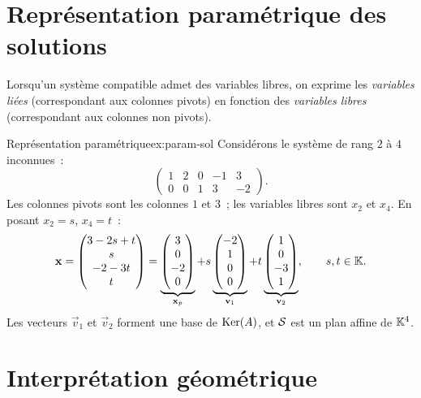 \section{Représentation paramétrique des solutions}\label{sec:parametrique}

Lorsqu'un système compatible admet des variables libres, on exprime les
\emph{variables liées} (correspondant aux colonnes
pivots) en fonction des \emph{variables libres}
(correspondant aux colonnes non pivots).

\begin{example}{Représentation paramétrique}{ex:param-sol}
  Considérons le système de rang $2$ à $4$ inconnues~:
  \[
    \left(\begin{array}{cccc|c}
      1 & 2 & 0 & -1 & 3\\
      0 & 0 & 1 & 3 & -2
    \end{array}\right).
  \]
  Les colonnes pivots sont les colonnes $1$ et $3$~; les variables libres
  sont $x_2$ et $x_4$. En posant $x_2=s$, $x_4=t$~:
  \[
    \mathbf{x}=\begin{pmatrix}3-2s+t\\s\\-2-3t\\t\end{pmatrix}
    =\underbrace{\begin{pmatrix}3\\0\\-2\\0\end{pmatrix}}_{\mathbf{x}_p}
    +s\underbrace{\begin{pmatrix}-2\\1\\0\\0\end{pmatrix}}_{\mathbf{v}_1}
    +t\underbrace{\begin{pmatrix}1\\0\\-3\\1\end{pmatrix}}_{\mathbf{v}_2},
    \qquad s,t\in{\mathbb{K}}.
  \]
  Les vecteurs $\vec{v}_1$ et $\vec{v}_2$ forment une base de $\operatorname{Ker}(A)$,
  et ${\mathcal{S}}$ est un plan affine de ${\mathbb{K}}^4$.
\end{example}

\section{Interprétation géométrique}\label{sec:interpretation-geom}

